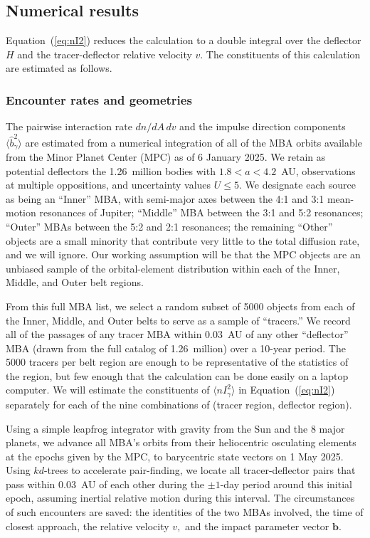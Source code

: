 \documentclass[linenumbers, onecolumn]{aastex631}
\newcommand{\eqq}[1]{Equation~(\ref{#1})}
\newcommand{\vecb}{\mathbf{b}}
\begin{document}
\subsection{Numerical results}
\eqq{eq:nI2} reduces the calculation to a double integral over the
deflector $H$ and the tracer-deflector relative velocity $v.$  The
constituents of this calculation are estimated as follows.

\subsubsection{Encounter rates and geometries}
The pairwise interaction rate $dn/dA\,dv$ and the impulse direction
components $\langle \hat b^2_\gamma \rangle$ are estimated from a
numerical integration of all of the MBA orbits available
from the Minor Planet Center (MPC) as of 6 January 2025.   We retain as
potential deflectors the 1.26~million bodies with $1.8<a<4.2$~AU,
observations at multiple oppositions, and uncertainty values $U\le5.$
We designate each source as being an ``Inner'' MBA, with semi-major axes between the 4:1 and 3:1
mean-motion resonances of Jupiter; ``Middle'' MBA between the 3:1 and
5:2 resonances; ``Outer'' MBAs between the 5:2 and 2:1
resonances; the remaining ``Other'' objects are a small minority that
contribute very little to the total diffusion rate, and we will ignore.  Our working
assumption will be that the MPC objects are an unbiased sample of the
orbital-element distribution within each of the Inner, Middle, and
Outer belt regions.

From this full MBA list, we select a random subset of 5000 objects
from each of the Inner, Middle, and Outer belts to serve as a sample
of ``tracers.''  We record all of the passages of any tracer MBA
within 0.03~AU of any other ``deflector'' MBA (drawn from the full
catalog of 1.26~million) over a 10-year period.  The 5000 tracers per
belt region are enough to be representative of the statistics of
the region, but few enough that the calculation can be done easily
on a laptop computer.
We will estimate the constituents of  $\langle nI_\gamma^2\rangle$ in
\eqq{eq:nI2} separately for each of the nine combinations of (tracer region, deflector region). 


Using a simple leapfrog integrator with gravity from the Sun and the 8
major planets, we advance all MBA's orbits from their heliocentric
osculating elements at the epochs given by the MPC, to barycentric
state vectors on 1 May 2025.  Using $kd$-trees to accelerate
pair-finding, we locate all tracer-deflector pairs
that pass within 0.03~AU of each other during the $\pm1$-day period
around this initial epoch, assuming inertial relative motion during
this interval.  The circumstances of such encounters are saved: the
identities of the two MBAs involved, the time of closest approach, the
relative velocity $v,$ and the impact parameter vector $\vecb.$
\end{document}
